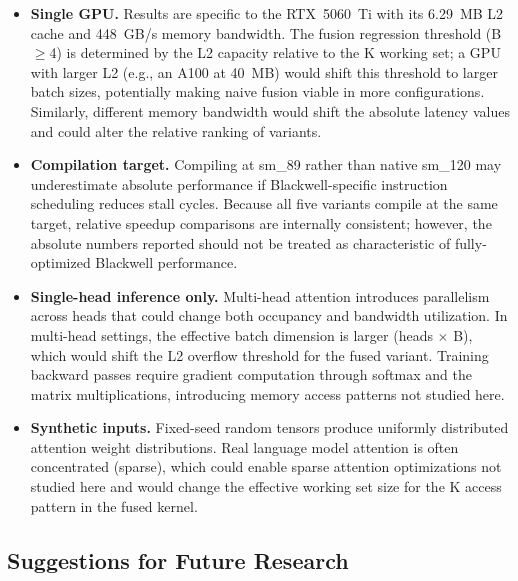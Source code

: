 \documentclass{article}
\begin{document}
\begin{itemize}[noitemsep]
  \item \textbf{Single GPU.} Results are specific to the RTX~5060~Ti with
        its 6.29~MB L2 cache and 448~GB/s memory bandwidth. The fusion
        regression threshold (B$\geq$4) is determined by the L2 capacity
        relative to the K working set; a GPU with larger L2 (e.g., an
        A100 at 40~MB) would shift this threshold to larger batch sizes,
        potentially making naive fusion viable in more configurations.
        Similarly, different memory bandwidth would shift the absolute
        latency values and could alter the relative ranking of variants.

  \item \textbf{Compilation target.} Compiling at sm\_89 rather than native
        sm\_120 may underestimate absolute performance if Blackwell-specific
        instruction scheduling reduces stall cycles. Because all five
        variants compile at the same target, relative speedup comparisons
        are internally consistent; however, the absolute numbers reported
        should not be treated as characteristic of fully-optimized Blackwell
        performance.

  \item \textbf{Single-head inference only.} Multi-head attention introduces
        parallelism across heads that could change both occupancy and
        bandwidth utilization. In multi-head settings, the effective batch
        dimension is larger (heads $\times$ B), which would shift the
        L2 overflow threshold for the fused variant. Training backward
        passes require gradient computation through softmax and the matrix
        multiplications, introducing memory access patterns not studied here.

  \item \textbf{Synthetic inputs.} Fixed-seed random tensors produce
        uniformly distributed attention weight distributions. Real language
        model attention is often concentrated (sparse), which could enable
        sparse attention optimizations not studied here and would change
        the effective working set size for the K access pattern in the
        fused kernel.
\end{itemize}

\subsection{Suggestions for Future Research}
\end{document}
